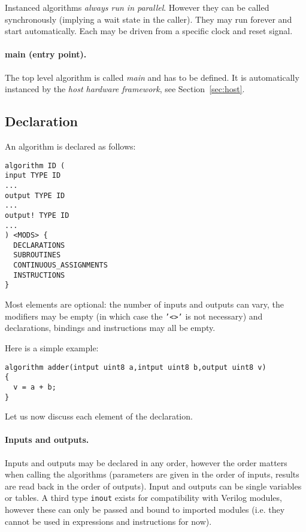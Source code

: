 \documentclass[a4]{article}
\newcommand\verilog{Verilog}
\begin{document}
Instanced algorithms \textit{always run in parallel}. However they can be called synchronously (implying a wait state in the caller). They may run forever and start automatically. Each may be driven from a specific clock and reset signal.

\paragraph{main (entry point).}
The top level algorithm is called \textit{main} and has to be defined. It is automatically instanced by the \textit{host hardware framework}, see Section~\ref{sec:host}.


\subsection{Declaration}

An algorithm is declared as follows:
\begin{verbatim}
algorithm ID (
input TYPE ID
...
output TYPE ID
...
output! TYPE ID
...
) <MODS> {
  DECLARATIONS
  SUBROUTINES
  CONTINUOUS_ASSIGNMENTS
  INSTRUCTIONS
}
\end{verbatim}

Most elements are optional: the number of inputs and outputs can vary, the modifiers may be empty (in which case the \texttt{'<>'} is not necessary) and declarations, bindings and instructions may all be empty.

Here is a simple example:
\begin{verbatim}
algorithm adder(intput uint8 a,intput uint8 b,output uint8 v)
{
  v = a + b;
}
\end{verbatim}

\noindent Let us now discuss each element of the declaration.


\paragraph{Inputs and outputs.}

Inputs and outputs may be declared in any order, however the order matters when calling the algorithms (parameters are given in the order of inputs, results are read back in the order of outputs). Input and outputs can be single variables or tables.
A third type \texttt{inout} exists for compatibility with \verilog{} modules, however these can only be passed and bound to imported modules (i.e. they cannot be used in expressions and instructions for now).
\end{document}
